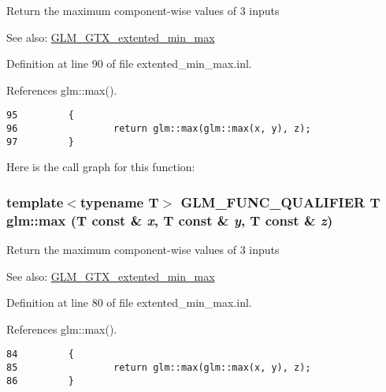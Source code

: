Return the maximum component-wise values of 3 inputs \begin{Desc}
\item[See also:]\hyperlink{group__gtx__extented__min__max}{GLM\_\-GTX\_\-extented\_\-min\_\-max} \end{Desc}


Definition at line 90 of file extented\_\-min\_\-max.inl.

References glm::max().

\begin{Code}\begin{verbatim}95         {
96                 return glm::max(glm::max(x, y), z);
97         }
\end{verbatim}
\end{Code}




Here is the call graph for this function:\hypertarget{group__gtx__extented__min__max_g15a13c57e770e4e4058140ce507632c0}{
\subsubsection[max]{\setlength{\rightskip}{0pt plus 5cm}template$<$typename T$>$ GLM\_\-FUNC\_\-QUALIFIER T glm::max (T const \& {\em x}, \/  T const \& {\em y}, \/  T const \& {\em z})}}
\label{group__gtx__extented__min__max_g15a13c57e770e4e4058140ce507632c0}


Return the maximum component-wise values of 3 inputs \begin{Desc}
\item[See also:]\hyperlink{group__gtx__extented__min__max}{GLM\_\-GTX\_\-extented\_\-min\_\-max} \end{Desc}


Definition at line 80 of file extented\_\-min\_\-max.inl.

References glm::max().

\begin{Code}\begin{verbatim}84         {
85                 return glm::max(glm::max(x, y), z);
86         }
\end{verbatim}
\end{Code}




